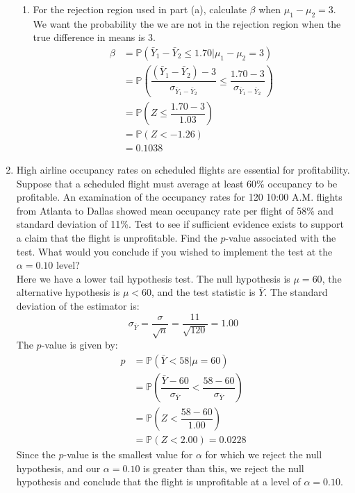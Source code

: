 \documentclass[12pt]{article}
\def\P{{\mathbb P}}
\begin{document}
\begin{enumerate}
\begin{enumerate}
\item For the rejection region used in part (a), calculate $\beta$ when $\mu_1 - \mu_2 = 3$.\\

We want the probability the we are not in the rejection region when the true difference in means is 3.
\begin{align*}
\beta &= \P( \bar{Y}_1 - \bar{Y}_2  \leq 1.70 | \mu_1 - \mu_2 = 3 ) \\
&= \P \left( \dfrac{ (\bar{Y}_1 - \bar{Y}_2) - 3 }{ \sigma_{\bar{Y}_1 - \bar{Y}_2} } \leq \dfrac{ 1.70 - 3 }{ \sigma_{\bar{Y}_1 - \bar{Y}_2} }  \right)\\
&= \P \left( Z \leq \dfrac{ 1.70 - 3 }{ 1.03 }  \right) \\
&= \P (Z < -1.26)\\
&= 0.1038
\end{align*}


\end{enumerate}

\item High airline occupancy rates on scheduled flights are essential for profitability. Suppose that a scheduled flight must average at least 60\% occupancy to be profitable. An examination of the occupancy rates for 120 10:00 A.M. flights from Atlanta to Dallas showed mean occupancy rate per flight of 58\% and standard deviation of 11\%. Test to see if sufficient evidence exists to support a claim that the flight is unprofitable. Find the $p$-value associated with the test. What would you conclude if you wished to implement the test at the $\alpha = 0.10$ level?\\

Here we have a lower tail hypothesis test. The null hypothesis is $\mu = 60$, the alternative hypothesis is $\mu < 60$, and the test statistic is $\bar{Y}$. The standard deviation of the estimator is:
\[
\sigma_{\bar{Y}} = \frac{\sigma}{\sqrt{n}} = \frac{11}{\sqrt{120}} = 1.00
\]
The $p$-value is given by:
\begin{align*}
p &= \P(\bar{Y} < 58 | \mu = 60)\\
&= \P \left(\dfrac{ \bar{Y} - 60 }{\sigma_\bar{Y} } <  \dfrac{ 58 - 60 }{\sigma_\bar{Y} }  \right) \\
&= \P \left( Z <   \dfrac{ 58 - 60 }{1.00 }  \right) \\
&= \P (Z < 2.00 ) = 0.0228
\end{align*}
Since the $p$-value is the smallest value for $\alpha$ for which we reject the null hypothesis, and our $\alpha = 0.10$ is greater than this, we reject the null hypothesis and conclude that the flight is unprofitable at a level of $\alpha = 0.10$.


\end{enumerate}
\end{document}
